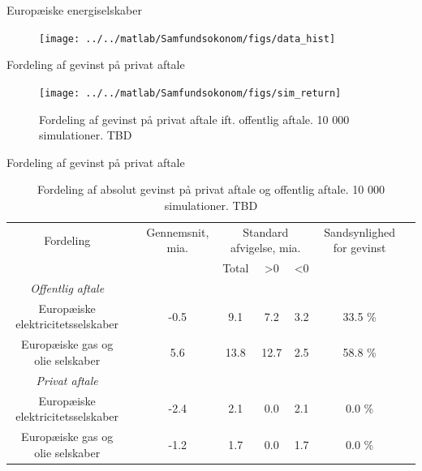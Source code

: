 \documentclass{beamer}
\newcommand\Fontvi{\fontsize{4}{7.2}\selectfont}
\begin{document}
\begin{frame}{Europæiske energiselskaber}
	\begin{figure}
\texttt{[image: ../../matlab/Samfundsokonom/figs/data\_hist]}
\label{fig:data_hist}
\end{figure}
\end{frame}

\begin{frame}{Fordeling af gevinst på privat aftale}
\begin{figure}
\texttt{[image: ../../matlab/Samfundsokonom/figs/sim\_return]}
\caption{Fordeling af gevinst på privat aftale ift. offentlig aftale. 10 000 simulationer. TBD }
\label{fig:sim}
\end{figure}
\end{frame}

\begin{frame}{Fordeling af gevinst på privat aftale}
\Fontvi
	\begin{table}[h]
	\caption{Fordeling af absolut gevinst på privat aftale og offentlig aftale. 10 000 simulationer. TBD}
	\label{tab:abs_fordeling}
	\begin{tabularx}{\linewidth}{cXcccccr}
	\toprule[1pt] 
	Fordeling && Gennemsnit, mia. & \multicolumn{3}{c}{Standard afvigelse, mia.}  & Sandsynlighed for gevinst\\
	& & &Total & >0 & <0 \\
	\hline 
	\emph{Offentlig aftale} \\
		Europæiske elektricitetsselskaber && -0.5  & 9.1  &7.2  & 3.2  & 33.5  \% \\
	Europæiske gas og olie selskaber && 5.6  & 13.8  & 12.7  & 2.5  &58.8  \% \\
	\emph{Privat aftale} \\
		Europæiske elektricitetsselskaber && -2.4  & 2.1 &0.0 &2.1 & 0.0  \% \\
	Europæiske gas og olie selskaber && -1.2  & 1.7 & 0.0 & 1.7 &0.0 \% \\
		\bottomrule[1pt]
	\end{tabularx}
	\begin{minipage}{\linewidth}
	\end{minipage}
\end{table}
\end{frame}
\end{document}
